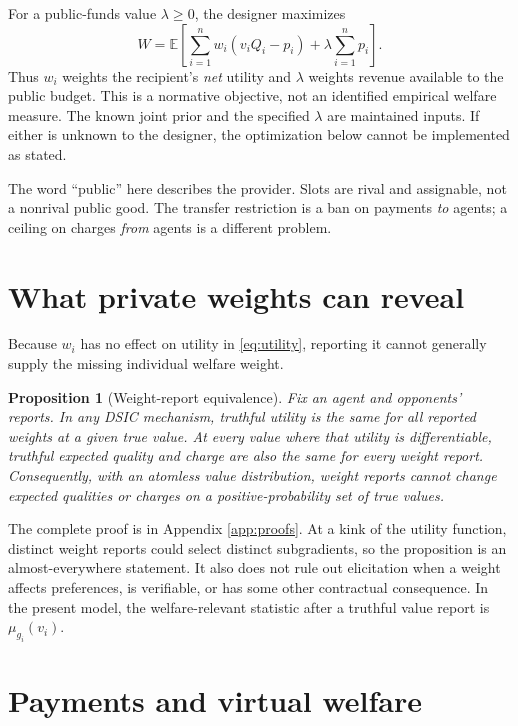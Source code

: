 \documentclass[11pt]{article}
\newtheorem{proposition}{Proposition}
\newcommand{\E}{\mathbb E}
\begin{document}
For a public-funds value $\lambda\ge0$, the designer maximizes
\begin{equation}\label{eq:objective}
W=\E\!\left[\sum_{i=1}^n w_i(v_iQ_i-p_i)+\lambda\sum_{i=1}^n p_i\right].
\end{equation}
Thus $w_i$ weights the recipient's \emph{net} utility and $\lambda$ weights revenue available to the public budget. This is a normative objective, not an identified empirical welfare measure. The known joint prior and the specified $\lambda$ are maintained inputs. If either is unknown to the designer, the optimization below cannot be implemented as stated.

The word ``public'' here describes the provider. Slots are rival and assignable, not a nonrival public good. The transfer restriction is a ban on payments \emph{to} agents; a ceiling on charges \emph{from} agents is a different problem.

\section{What private weights can reveal}\label{sec:weights}

Because $w_i$ has no effect on utility in \eqref{eq:utility}, reporting it cannot generally supply the missing individual welfare weight.

\begin{proposition}[Weight-report equivalence]\label{prop:weights}
Fix an agent and opponents' reports. In any DSIC mechanism, truthful utility is the same for all reported weights at a given true value. At every value where that utility is differentiable, truthful expected quality and charge are also the same for every weight report. Consequently, with an atomless value distribution, weight reports cannot change expected qualities or charges on a positive-probability set of true values.
\end{proposition}

The complete proof is in Appendix \ref{app:proofs}. At a kink of the utility function, distinct weight reports could select distinct subgradients, so the proposition is an almost-everywhere statement. It also does not rule out elicitation when a weight affects preferences, is verifiable, or has some other contractual consequence. In the present model, the welfare-relevant statistic after a truthful value report is $\mu_{g_i}(v_i)$.

\section{Payments and virtual welfare}\label{sec:score}
\end{document}
